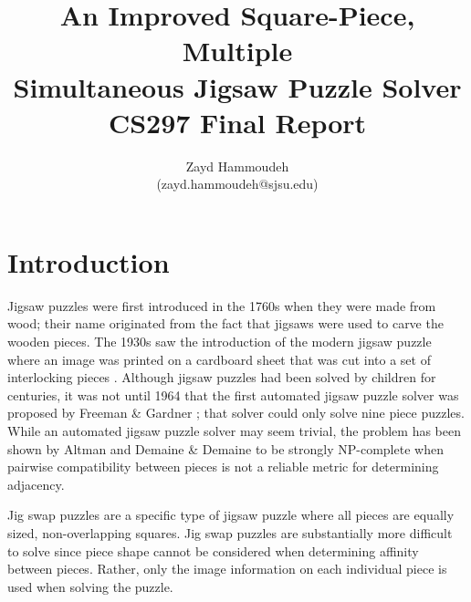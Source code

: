 \documentclass{report}
\title{   An Improved Square-Piece, Multiple
       \\ Simultaneous Jigsaw Puzzle Solver
       \\[1in]
	   CS297 Final Report}
\author{
  Zayd Hammoudeh \\
  (zayd.hammoudeh@sjsu.edu)
  }
\begin{document}
\maketitle


\renewcommand{\contentsname}{Table of Contents} %
\tableofcontents{\protect\newpage}

\listoffigures
\newpage

\listoftables
\newpage
 

\renewcommand\thesection{\arabic{section}}






\section{Introduction}\label{sec:introduction}

Jigsaw puzzles were first introduced in the 1760s when they were made from wood; their name originated from the fact that jigsaws were used to carve the wooden pieces.   The 1930s saw the introduction of the modern jigsaw puzzle where an image was printed on a cardboard sheet that was cut into a set of interlocking pieces \cite{williams1990, williams2004}.  Although jigsaw puzzles had been solved by children for centuries, it was not until 1964 that the first automated jigsaw puzzle solver was proposed by Freeman \& Gardner \cite{freeman1964}; that solver could only solve nine piece puzzles.  While an automated jigsaw puzzle solver may seem trivial, the problem has been shown by Altman \cite{altman1990} and Demaine \& Demaine \cite{demaine2007} to be strongly NP-complete when pairwise compatibility between pieces is not a reliable metric for determining adjacency.

Jig swap puzzles are a specific type of jigsaw puzzle where all pieces are equally sized, non-overlapping squares.  Jig swap puzzles are substantially more difficult to solve since piece shape cannot be considered when determining affinity between pieces.  Rather, only the image information on each individual piece is used when solving the puzzle.  
\end{document}
